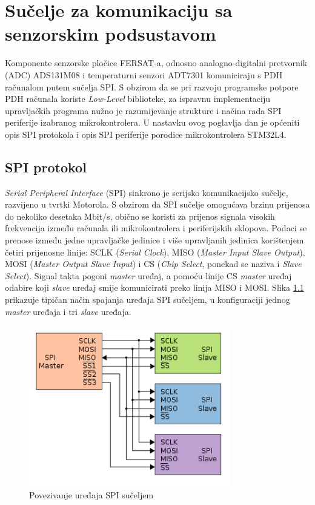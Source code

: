 \chapter{Sučelje za komunikaciju sa senzorskim podsustavom}
Komponente senzorske pločice FERSAT-a, odnosno analogno-digitalni pretvornik (ADC) ADS131M08 i temperaturni senzori ADT7301 komuniciraju s PDH računalom putem sučelja SPI. S obzirom da se pri razvoju programske potpore PDH računala koriste \textit{Low-Level} biblioteke, za ispravnu implementaciju upravljačkih programa nužno je razumijevanje strukture i načina rada SPI periferije izabranog mikrokontrolera. U nastavku ovog poglavlja dan je općeniti opis SPI protokola i opis SPI periferije porodice mikrokontrolera STM32L4.

\section{SPI protokol}
\textit{Serial Peripheral Interface} (SPI) sinkrono je serijsko komunikacijsko sučelje, razvijeno u tvrtki Motorola. S obzirom da SPI sučelje omogućava brzinu prijenosa do nekoliko desetaka Mbit/s, obično se koristi za prijenos signala visokih frekvencija između računala ili mikrokontrolera i periferijskih sklopova. Podaci se prenose između jedne upravljačke jedinice  i više upravljanih jedinica  korištenjem četiri prijenosne linije: SCLK (\textit{Serial Clock}), MISO (\textit{Master Input Slave Output}), MOSI (\textit{Master Output Slave Input}) i CS (\textit{Chip Select}, ponekad se naziva i \textit{Slave Select}). Signal takta pogoni \textit{master} uređaj, a pomoću linije CS \textit{master} uređaj odabire koji \textit{slave} uređaj smije komunicirati preko linija MISO i MOSI. Slika \ref{fig:spi} prikazuje tipičan način spajanja uređaja SPI sučeljem, u konfiguraciji jednog \textit{master} uređaja i tri \textit{slave} uređaja.

\begin{figure}[htb]
	\centering
	\includegraphics[height=7cm]{slike/spi.png}
	\caption{Povezivanje uređaja SPI sučeljem \cite{spi_wikipedia}}
	\label{fig:spi}
\end{figure}


